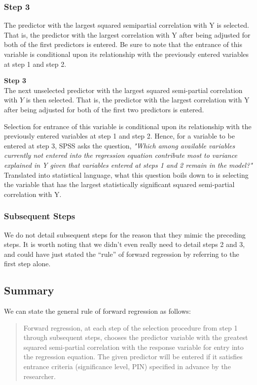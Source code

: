 \subsubsection*{Step 3}
The predictor with the largest squared semipartial correlation with Y is selected. That is, the predictor with the largest correlation with Y after being adjusted for both of the first predictors is entered. Be sure to note that the entrance of this variable is conditional upon its relationship with the previously entered variables at step 1 and step 2. 

\textbf{Step 3}\\
The next unselected predictor with the largest squared semi-partial correlation with $Y$ is then selected. That is, the predictor with the largest correlation with Y after being adjusted for both of the first two predictors is entered. 

Selection for entrance of this variable is conditional upon its relationship with the previously entered variables at step 1 and step 2. Hence, for a variable to be entered at step 3, SPSS asks the question, \textit{"Which among available variables currently not entered into the regression equation contribute most to variance explained in Y given that variables entered at steps 1 and 2 remain in the model?"} Translated into statistical language, what this question boils down to is selecting the variable that has the largest statistically significant squared semi-partial correlation with Y.




\subsubsection*{Subsequent Steps} 
We do not detail subsequent steps for the reason that they mimic the preceding steps. It is worth noting that we didn’t even really need to detail steps 2 and 3, and could have just stated the “rule” of forward regression by referring to the first step alone. 

\subsection*{Summary}
We can state the general rule of forward regression as follows:
\begin{quote}
	Forward regression, at each step of the selection procedure from step 1 through subsequent steps, chooses the predictor variable with the greatest squared semi-partial correlation with the response variable for entry into the regression equation. The given predictor will be entered if it satisfies entrance criteria (significance level, PIN) specified in advance by the researcher.
\end{quote}

